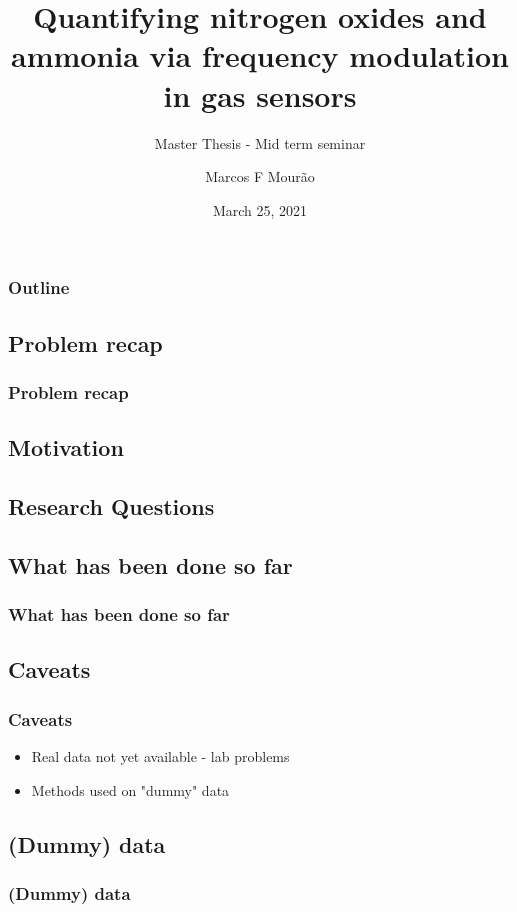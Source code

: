 \documentclass{beamer}
\title{Quantifying nitrogen oxides and ammonia via frequency modulation in gas sensors}
\subtitle{Master Thesis - Mid term seminar}
\author{Marcos F Mourão}
\date{March 25, 2021}
\begin{document}
	\begin{frame}
		\titlepage
	\end{frame}

\begin{frame}
	\frametitle{Outline}
	\tableofcontents
\end{frame}

\begin{frame}
	\section{Problem recap}
	\frametitle{Problem recap}
	
	\subsection{Motivation}
	
	\subsection{Research Questions}
\end{frame}

\begin{frame}
	\section{What has been done so far}
	\frametitle{What has been done so far}
	
\end{frame}

\begin{frame}
	\section{Caveats}
	\frametitle{Caveats}
	
	\begin{itemize}
		\item Real data not yet available - lab problems
		\item Methods used on "dummy" data
	\end{itemize}
	
\end{frame}

\begin{frame}
	\section{(Dummy) data}
	\frametitle{(Dummy) data}
	
\end{frame}
\end{document}
